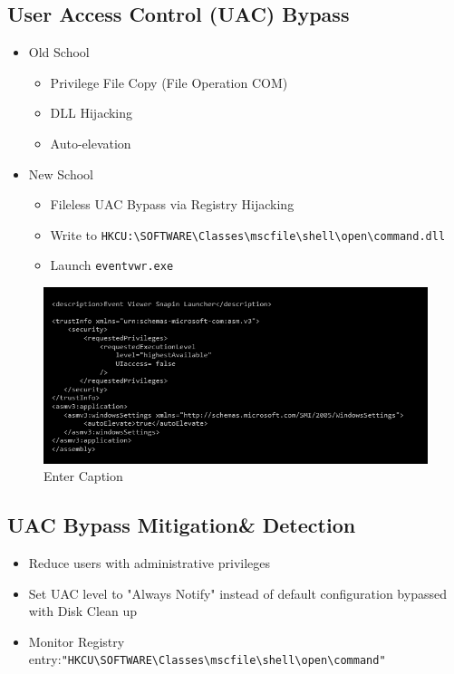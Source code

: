 \subsection{User Access Control (UAC) Bypass}
\begin{itemize}
    \item Old School
    \begin{itemize}
        \item Privilege File Copy (File Operation COM)
        \item DLL Hijacking
        \item Auto-elevation
    \end{itemize}
\item New School
\begin{itemize}
    \item Fileless UAC Bypass via Registry Hijacking
    \item Write to \texttt{HKCU:\textbackslash SOFTWARE\textbackslash Classes\textbackslash mscfile\textbackslash shell\textbackslash open\textbackslash command.dll}
    \item Launch \texttt{eventvwr.exe}
\end{itemize}
\end{itemize}
\begin{figure}
    \centering
    \includegraphics[width=0.75\linewidth]{eventvwr.png}
    \caption{Enter Caption}
    \label{fig:placeholder}
\end{figure}
\subsection{UAC Bypass Mitigation\& Detection}
\begin{itemize}
    \item Reduce users with administrative privileges
    \item Set UAC level to "Always Notify" instead of default configuration bypassed with Disk Clean up
    \item Monitor Registry entry:\texttt{"HKCU\textbackslash SOFTWARE\textbackslash Classes\textbackslash mscfile\textbackslash shell\textbackslash open\textbackslash command"}
\end{itemize}

